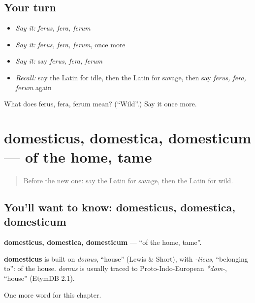 \subsection*{Your turn}
\begin{itemize}
\raggedright
  \item \emph{Say it:} \emph{ferus, fera, ferum}
  \item \emph{Say it:} \emph{ferus, fera, ferum}, once more
  \item \emph{Say it:} say \emph{ferus, fera, ferum}
  \item \emph{Recall:} say the Latin for idle, then the Latin for savage, then say \emph{ferus, fera, ferum} again
\end{itemize}

\begin{tcolorbox}[breakable,colback=teal!4,colframe=teal!35!black,title={Before you move on}]
What does ferus, fera, ferum mean? (\textquotedblleft{}Wild\textquotedblright{}.) Say it once more.
\end{tcolorbox}
\section[domesticus, domestica, domesticum]{domesticus, domestica, domesticum — of the home, tame}

\label{lesson:LA-C214-domesticus}



\begin{quote}
Before the new one: say the Latin for savage, then the Latin for wild.
\end{quote}

\subsection*{You'll want to know: domesticus, domestica, domesticum}
\textbf{domesticus, domestica, domesticum} — \textquotedblleft{}of the home, tame\textquotedblright{}.

\begin{cousinweb}
\textbf{domesticus} is built on \emph{domus}, \textquotedblleft{}house\textquotedblright{} (Lewis \& Short), with \emph{-ticus}, \textquotedblleft{}belonging to\textquotedblright{}: of the house. \emph{domus} is usually traced to Proto-Indo-European \emph{*dom-}, \textquotedblleft{}house\textquotedblright{} (EtymDB 2.1).
\end{cousinweb}

\begin{grammarlens}[title={What you've built}]
One more word for this chapter.
\end{grammarlens}

